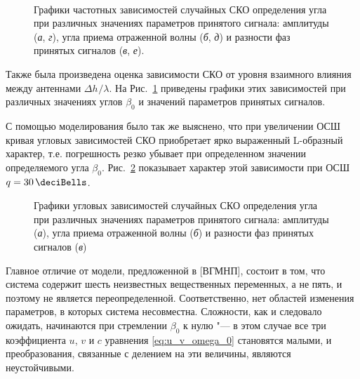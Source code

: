 \documentclass[../main.tex]{subfiles}
\begin{document}
\begin{figure}[hpb]
  \centering
  \\

  \caption{Графики частотных зависимостей случайных СКО определения угла при различных значениях параметров принятого сигнала: амплитуды (\textit{а}, \textit{г}), угла приема отраженной волны (\textit{б}, \textit{д}) и разности фаз принятых сигналов (\textit{в}, \textit{е}).}
  \label{fig:surface:pic3}
\end{figure}

Также была произведена оценка зависимости СКО от уровня взаимного влияния между антеннами $\Delta h^{}/\lambda$. На Рис.~\ref{fig:surface:pic3} приведены графики этих зависимостей при различных значениях углов $\beta_0$ и значений параметров принятых сигналов.

С помощью моделирования было так же выяснено, что при увеличении ОСШ кривая угловых зависимостей СКО приобретает ярко выраженный L-образный характер, т.е. погрешность резко убывает при определенном значении определяемого угла $\beta_0$. Рис.~\ref{fig:surface:pic4} показывает характер этой зависимости при ОСШ $q = \SI{30}{\deciBells}$.

\begin{figure}[hpb]
  \centering

  \caption{Графики угловых зависимостей случайных СКО определения угла при различных значениях параметров принятого сигнала: амплитуды (\textit{а}), угла приема отраженной волны (\textit{б}) и разности фаз принятых сигналов (\textit{в})}
  \label{fig:surface:pic4}
\end{figure}

Главное отличие от модели, предложенной в [ВГМНП], состоит в том, что система содержит шесть неизвестных вещественных переменных, а не пять, и поэтому не является переопределенной. Соответственно, нет областей изменения параметров, в которых система несовместна. Сложности, как и следовало ожидать, начинаются при стремлении $\beta_0$ к нулю "--- в этом случае все три коэффициента $u$, $v$ и $c$ уравнения \eqref{eq:u_v_omega_0} становятся малыми, и преобразования, связанные с делением на эти величины, являются неустойчивыми.
\end{document}

